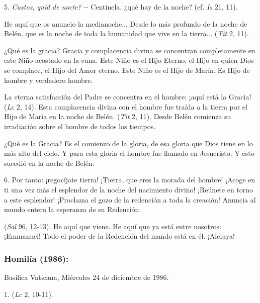 \begin{body}
\begin{body}
		5. \emph{Custos, quid de nocte?} -\/- Centinela, ¿qué hay de la noche? (cf. \emph{Is} 21, 11).
		
		He aquí que os anuncio la medianoche... Desde lo más profundo de la noche de Belén, que es la noche de toda la humanidad que vive en la tierra...  (\emph{Tit} 2, 11).
		
		¿Qué es la gracia? Gracia y complacencia divina se concentran completamente en este Niño acostado en la cuna. Este Niño es el Hijo Eterno, el Hijo en quien Dios se complace, el Hijo del Amor eterno. Este Niño es el Hijo de María. Es Hijo de hombre y verdadero hombre.
		
		La eterna satisfacción del Padre se concentra en el hombre: ¡aquí está la Gracia!  (\emph{Lc} 2, 14). Esta complacencia divina con el hombre fue traída a la tierra por el Hijo de María en la noche de Belén.  (\emph{Tit} 2, 11). Desde Belén comienza su irradiación sobre el hombre de todos los tiempos.
		
		¿Qué es la Gracia? Es el comienzo de la gloria, de esa gloria que Dios tiene en lo más alto del cielo. Y para esta gloria el hombre fue llamado en Jesucristo. Y esto sucedió en la noche de Belén.
		
		6. Por tanto: ¡regocíjate tierra! ¡Tierra, que eres la morada del hombre! ¡Acoge en ti una vez más el esplendor de la noche del nacimiento divino! ¡Reúnete en torno a este esplendor! ¡Proclama el gozo de la redención a toda la creación! Anuncia al mundo entero la esperanza de su Redención.
		
		 (\emph{Sal} 96, 12-13). He aquí que viene. He aquí que ya está entre nosotros: ¡Emmanuel! Todo el poder de la Redención del mundo está en él. ¡Aleluya!
	\end{body}
	
	\subsubsection{Homilía (1986): }
	
	Basílica Vaticana, Miércoles 24 de diciembre de 1986.
	
	\begin{body}
		1.  (\emph{Lc} 2, 10-11).
		

\end{body}
\end{body}
